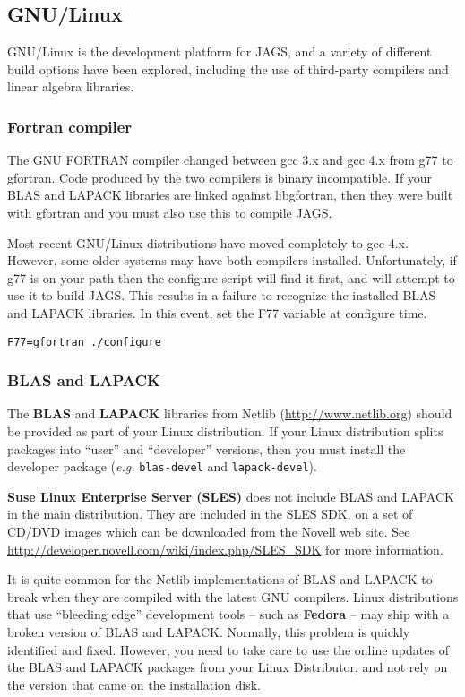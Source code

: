 \documentclass[11pt, a4paper, titlepage]{article}
\newcommand{\JAGS}{\textsf{JAGS}}
\newcommand{\code}[1]{{\bgroup{\normalfont\ttfamily #1}\egroup}}
\begin{document}
\subsection{GNU/Linux}
\label{section:gnulinux}

GNU/Linux is the development platform for \JAGS, and a variety of
different build options have been explored, including the use of
third-party compilers and linear algebra libraries.

\subsubsection{Fortran compiler}

The GNU FORTRAN compiler changed between gcc 3.x and gcc 4.x from
\code{g77} to \code{gfortran}. Code produced by the two compilers is
binary incompatible. If your BLAS and LAPACK libraries are linked
against \code{libgfortran}, then they were built with \code{gfortran}
and you must also use this to compile \JAGS. 

Most recent GNU/Linux distributions have moved completely to gcc 4.x.
However, some older systems may have both compilers installed.
Unfortunately, if \code{g77} is on your path then the configure script
will find it first, and will attempt to use it to build \JAGS. This
results in a failure to recognize the installed BLAS and LAPACK
libraries. In this event, set the \code{F77} variable at configure time.
\begin{verbatim}
F77=gfortran ./configure
\end{verbatim}

\subsubsection{BLAS and LAPACK}

The {\bf BLAS} and {\bf LAPACK} libraries from Netlib
(\url{http://www.netlib.org}) should be provided as part of your Linux
distribution. If your Linux distribution splits packages into ``user''
and ``developer'' versions, then you must install the developer
package ({\em e.g.}  \texttt{blas-devel} and \texttt{lapack-devel}).

{\bf Suse Linux Enterprise Server (SLES)} does not include BLAS and
LAPACK in the main distribution. They are included in the SLES SDK, on
a set of CD/DVD images which can be downloaded from the Novell web
site.  See \url{http://developer.novell.com/wiki/index.php/SLES_SDK}
for more information.

It is quite common for the Netlib implementations of BLAS and LAPACK
to break when they are compiled with the latest GNU compilers.  Linux
distributions that use ``bleeding edge'' development tools -- such as
{\bf Fedora} -- may ship with a broken version of BLAS and
LAPACK. Normally, this problem is quickly identified and
fixed. However, you need to take care to use the online updates of the
BLAS and LAPACK packages from your Linux Distributor, and not rely on
the version that came on the installation disk.
\end{document}

